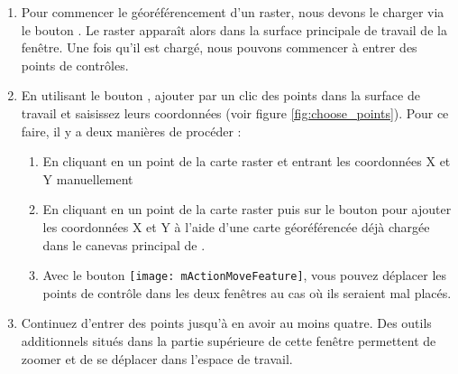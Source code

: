 \begin{enumerate}
\item Pour commencer le géoréférencement d'un raster, nous devons le charger via le bouton . Le raster apparaît alors dans la surface principale de travail de la fenêtre. Une fois qu'il est chargé, nous pouvons commencer à entrer des points de contrôles.

\item En utilisant le bouton , ajouter par un clic des points dans la surface de travail et saisissez leurs coordonnées (voir figure \ref{fig:choose_points}). Pour ce faire, il y a deux manières de procéder :

\begin{enumerate}
\item En cliquant en un point de la carte raster et entrant les coordonnées X et Y manuellement
\item En cliquant en un point de la carte raster puis sur le bouton  pour ajouter les coordonnées X et Y à l'aide d'une carte géoréférencée déjà chargée dans le canevas principal de \qg.
\item Avec le bouton \texttt{[image: mActionMoveFeature]}, vous pouvez déplacer les points de contrôle dans les deux fenêtres au cas où ils seraient mal placés.
\end{enumerate}
\item Continuez d'entrer des points jusqu'à en avoir au moins quatre. Des outils additionnels situés dans la partie supérieure de cette fenêtre permettent de zoomer et de se déplacer dans l'espace de travail.
\end{enumerate}

